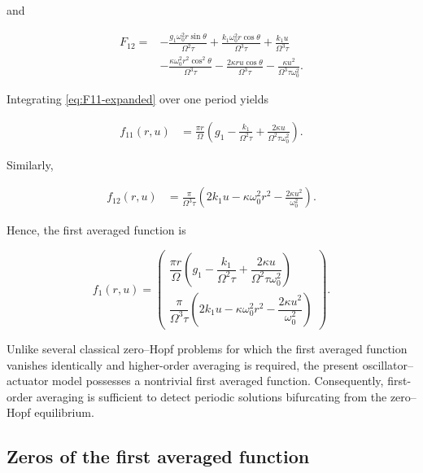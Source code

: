 \documentclass[11pt,reqno]{amsart}
\theoremstyle{plain}
\theoremstyle{definition}
\theoremstyle{remark}
\begin{document}
and

\begin{equation}
\label{eq:F12-expanded}
\boxed{
\begin{aligned}
F_{12}
={}&
-\frac{g_1\omega_0^2r\sin\theta}
{\Omega^2\tau}
+\frac{k_1\omega_0^2r\cos\theta}
{\Omega^3\tau}
+\frac{k_1u}{\Omega^3\tau}
\\
&
-\frac{\kappa\omega_0^2r^2\cos^2\theta}
{\Omega^3\tau}
-\frac{2\kappa ru\cos\theta}
{\Omega^3\tau}
-\frac{\kappa u^2}
{\Omega^3\tau\omega_0^2}.
\end{aligned}}
\end{equation}

Integrating \eqref{eq:F11-expanded} over one period yields

\begin{align}
f_{11}(r,u)
&=
\frac{\pi r}{\Omega}
\left(
g_1
-
\frac{k_1}{\Omega^2\tau}
+
\frac{2\kappa u}
{\Omega^2\tau\omega_0^2}
\right).
\end{align}

Similarly,

\begin{align}
f_{12}(r,u)
&=
\frac{\pi}{\Omega^3\tau}
\left(
2k_1u
-
\kappa\omega_0^2r^2
-
\frac{2\kappa u^2}
{\omega_0^2}
\right).
\end{align}

Hence, the first averaged function is

\begin{equation}
\label{eq:first-averaged-function}
\boxed{
f_1(r,u)
=
\begin{pmatrix}
\dfrac{\pi r}{\Omega}
\left(
g_1
-\dfrac{k_1}{\Omega^2\tau}
+\dfrac{2\kappa u}
{\Omega^2\tau\omega_0^2}
\right)
\\[6mm]
\dfrac{\pi}{\Omega^3\tau}
\left(
2k_1u
-
\kappa\omega_0^2r^2
-
\dfrac{2\kappa u^2}
{\omega_0^2}
\right)
\end{pmatrix}.
}
\end{equation}

Unlike several classical zero--Hopf problems for which the first
averaged function vanishes identically and higher-order averaging is
required, the present oscillator--actuator model possesses a
nontrivial first averaged function. Consequently, first-order
averaging is sufficient to detect periodic solutions bifurcating from
the zero--Hopf equilibrium.

\subsection{Zeros of the first averaged function}
\end{document}
